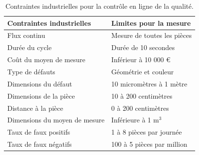 \begin{table}[bthp]
	\centering
	\begin{tabular}{|l|l|}
		\arrayrulecolor{black}
		\hline
		Contraintes industrielles & Limites pour la mesure \\ \hline
		\hline
		Flux continu & Mesure de toutes les pièces \\ \hline
		Durée du cycle & Durée de 10 secondes \\ \hline
		Coût du moyen de mesure & Inférieur à 10 000 € \\ \hline
		\hline
		Type de défauts & Géométrie et couleur \\ \hline \hline
		Dimensions du défaut & 10 micromètres à 1 mètre \\ \hline
		Dimensions de la pièce & 10 à 200 centimètres \\ \hline
		\hline
		Distance à la pièce & 0 à 200 centimètres \\ \hline
		Dimensions du moyen de mesure & Inférieure à 1 m$^3$ \\ \hline
		\hline
		Taux de faux positifs & 1 à 8 pièces par journée \\ \hline
		Taux de faux négatifs & 100 à 5 pièces par million \\ \hline
	\end{tabular}
	\caption{Contraintes industrielles pour la contrôle en ligne de la qualité.}
	\label{tab:industrial_constraints}
\end{table}

